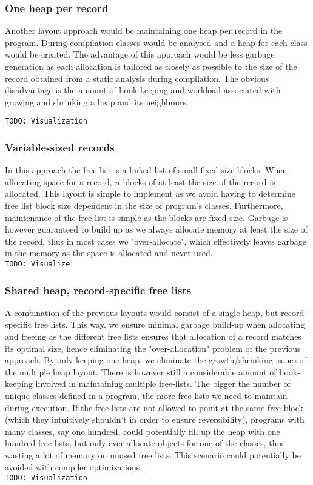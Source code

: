 \subsubsection{One heap per record}
Another layout approach would be maintaining one heap per record in the program. During compilation classes would be analysed and a heap for each class would be created. The advantage of this approach would be less garbage generation as each allocation is tailored as closely as possible to the size of the record obtained from a static analysis during compilation. The obvious disadvantage is the amount of book-keeping and workload associated with growing and shrinking a heap and its neighbours.

\texttt{TODO: Visualization} 

\subsubsection{Variable-sized records}
In this approach the free list is a linked list of small fixed-size blocks. When allocating space for a record, $n$ blocks of at least the size of the record is allocated. This layout is simple to implement as we avoid having to determine free list block size dependent in the size of program's classes. Furthermore, maintenance of the free list is simple as the blocks are fixed size. Garbage is however guaranteed to build up as we always allocate memory at least the size of the record, thus in most cases we "over-allocate", which effectively leaves garbage in the memory as the space is allocated and never used.\\

\texttt{TODO: Visualize}

\subsubsection{Shared heap, record-specific free lists}
A combination of the previous layouts would consist of a single heap, but record-specific free lists. This way, we ensure minimal garbage build-up when allocating and freeing as the different free lists ensures that allocation of a record matches its optimal size, hence eliminating the "over-allocation" problem of the previous approach. By only keeping one heap, we eliminate the growth/shrinking issues of the multiple heap layout. There is however still a considerable amount of book-keeping involved in maintaining multiple free-lists. The bigger the number of unique classes defined in a program, the more free-lists we need to maintain during execution. If the free-lists are not allowed to point at the same free block (which they intuitively shouldn't in order to ensure reversibility), programs with many classes, say one hundred, could potentially fill up the heap with one hundred free lists, but only ever allocate objects for one of the classes, thus wasting a lot of memory on unused free lists. This scenario could potentially be avoided with compiler optimizations.\\

\texttt{TODO: Visualization}

